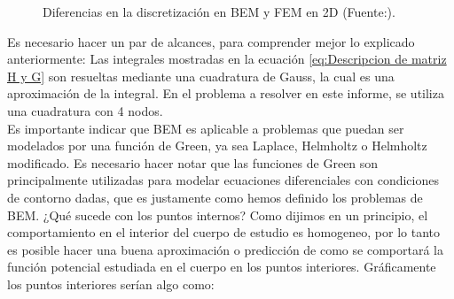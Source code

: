 \begin{figure}[H]
\label{fig:Discretizacion BEM y FEM 2}
\centering
{}
\caption{Diferencias en la discretización en BEM y FEM en 2D  (Fuente:\cite{Brebbia}).}
\end{figure}
Es necesario hacer un par de alcances, para comprender mejor lo explicado anteriormente:
Las integrales mostradas en la ecuación \eqref{eq:Descripcion de matriz H y G} son resueltas mediante una cuadratura de Gauss, la cual es una aproximación de la integral. En el problema a resolver en este informe, se utiliza una cuadratura con 4 nodos.\\
Es importante indicar que BEM es aplicable a problemas que puedan ser modelados por una función de Green, ya sea Laplace, Helmholtz o Helmholtz modificado. Es necesario hacer notar que las funciones de Green son principalmente utilizadas para modelar ecuaciones diferenciales con condiciones de contorno dadas, que es justamente como hemos definido los problemas de BEM.
\newpage
¿Qué sucede con los puntos internos? Como dijimos en un principio, el comportamiento en el interior del cuerpo de estudio es homogeneo, por lo tanto es posible hacer una buena aproximación o predicción de como se comportará la función potencial estudiada en el cuerpo en los puntos interiores. Gráficamente los puntos interiores serían algo como:
